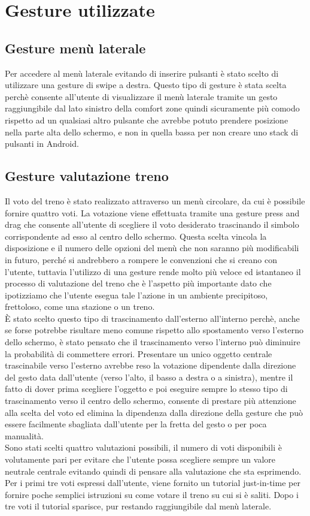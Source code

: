 \section{Gesture utilizzate\label{sec:gesture}}
\subsection{Gesture menù laterale}
Per accedere al menù laterale evitando di inserire pulsanti è stato scelto di utilizzare una gesture di swipe a destra. Questo tipo di gesture è stata scelta perchè consente all'utente di visualizzare il menù laterale tramite un gesto raggiungibile dal lato sinistro della comfort zone quindi sicuramente più comodo rispetto ad un qualsiasi altro pulsante che avrebbe potuto prendere posizione nella parte alta dello schermo, e non in quella bassa per non creare uno stack di pulsanti in Android. 
\subsection{Gesture valutazione treno}
Il voto del treno è stato realizzato attraverso un menù circolare, da cui è possibile fornire quattro voti. La votazione viene effettuata tramite una gesture press and drag che consente all'utente di scegliere il voto desiderato trascinando il simbolo corrispondente ad esso al centro dello schermo. 
Questa scelta vincola la disposizione e il numero delle opzioni del menù che non saranno più modificabili in futuro, perché si andrebbero a rompere le convenzioni che si creano con l'utente, tuttavia l'utilizzo di una gesture rende molto più veloce ed istantaneo il processo di valutazione del treno che è l'aspetto più importante dato che ipotizziamo che l'utente esegua tale l'azione in un ambiente precipitoso, frettoloso, come una stazione o un treno.   
\\È stato scelto questo tipo di trascinamento dall'esterno all'interno perchè, anche se forse potrebbe risultare meno comune rispetto allo spostamento verso l'esterno dello schermo, è stato pensato che il trascinamento verso l'interno può diminuire la probabilità di commettere errori. Presentare un unico oggetto centrale trascinabile verso l'esterno avrebbe reso la votazione dipendente dalla direzione del gesto data dall'utente (verso l'alto, il basso a destra o a sinistra), mentre il fatto di dover prima scegliere l'oggetto e poi eseguire sempre lo stesso tipo di trascinamento verso il centro dello schermo, consente di prestare più attenzione alla scelta del voto ed elimina la dipendenza dalla direzione della gesture che può essere facilmente sbagliata dall'utente per la fretta del gesto o per poca manualità. 
\\Sono stati scelti quattro valutazioni possibili, il numero di voti disponibili è volutamente pari per evitare che l'utente possa scegliere sempre un valore neutrale centrale evitando quindi di pensare alla valutazione che sta esprimendo. 
Per i primi tre voti espressi dall'utente, viene fornito un tutorial just-in-time per fornire poche semplici istruzioni su come votare il treno su cui si è saliti. Dopo i tre voti il tutorial sparisce, pur restando raggiungibile dal menù laterale.

